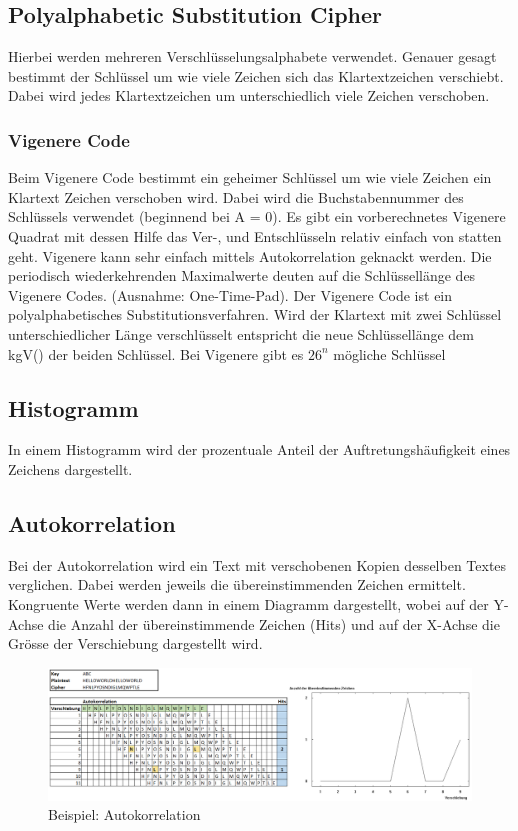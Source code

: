 \subsection{Polyalphabetic Substitution Cipher}
Hierbei werden mehreren Verschlüsselungsalphabete verwendet. Genauer gesagt bestimmt der Schlüssel um wie viele Zeichen sich das Klartextzeichen verschiebt. Dabei wird jedes Klartextzeichen um unterschiedlich viele Zeichen verschoben.

\subsubsection{Vigenere Code}
Beim Vigenere Code bestimmt ein geheimer Schlüssel um wie viele Zeichen ein Klartext Zeichen verschoben wird. Dabei wird die Buchstabennummer des Schlüssels verwendet (beginnend bei A = 0). Es gibt ein vorberechnetes Vigenere Quadrat mit dessen Hilfe das Ver-, und Entschlüsseln relativ einfach von statten geht. Vigenere kann sehr einfach mittels Autokorrelation geknackt werden. Die periodisch wiederkehrenden Maximalwerte deuten auf die Schlüssellänge des Vigenere Codes. (Ausnahme: One-Time-Pad). Der Vigenere Code ist ein polyalphabetisches Substitutionsverfahren. Wird der Klartext mit zwei Schlüssel unterschiedlicher Länge verschlüsselt entspricht die neue Schlüssellänge dem kgV() der beiden Schlüssel. Bei Vigenere gibt es $26^n$ mögliche Schlüssel

\subsection{Histogramm}
In einem Histogramm wird der prozentuale Anteil der Auftretungshäufigkeit eines Zeichens dargestellt.

\subsection{Autokorrelation}
Bei der Autokorrelation wird ein Text mit verschobenen Kopien desselben Textes verglichen. Dabei werden jeweils die übereinstimmenden Zeichen ermittelt. Kongruente Werte werden dann in einem Diagramm dargestellt, wobei auf der Y-Achse die Anzahl der übereinstimmende Zeichen (Hits) und auf der X-Achse die Grösse der Verschiebung dargestellt wird.
\begin{figure}[h]
	\centering
	\includegraphics[width=0.8\linewidth]{images/autokorrelation}
	\caption{Beispiel: Autokorrelation}
\end{figure}

